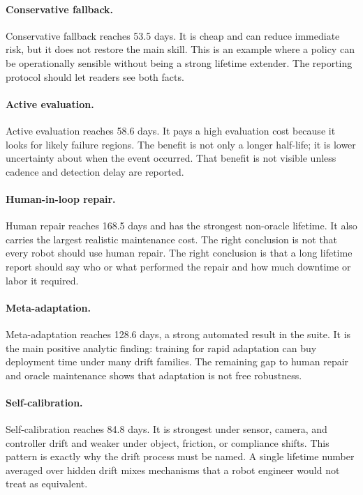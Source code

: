 \documentclass{article}
\begin{document}
\paragraph{Conservative fallback.}
Conservative fallback reaches 53.5 days. It is cheap and can reduce immediate
risk, but it does not restore the main skill. This is an example where a policy
can be operationally sensible without being a strong lifetime extender. The
reporting protocol should let readers see both facts.

\paragraph{Active evaluation.}
Active evaluation reaches 58.6 days. It pays a high evaluation cost because it
looks for likely failure regions. The benefit is not only a longer half-life;
it is lower uncertainty about when the event occurred. That benefit is not
visible unless cadence and detection delay are reported.

\paragraph{Human-in-loop repair.}
Human repair reaches 168.5 days and has the strongest non-oracle lifetime. It
also carries the largest realistic maintenance cost. The right conclusion is
not that every robot should use human repair. The right conclusion is that a
long lifetime report should say who or what performed the repair and how much
downtime or labor it required.

\paragraph{Meta-adaptation.}
Meta-adaptation reaches 128.6 days, a strong automated result in the suite. It
is the main positive analytic finding: training for rapid adaptation can buy
deployment time under many drift families. The remaining gap to human repair
and oracle maintenance shows that adaptation is not free robustness.

\paragraph{Self-calibration.}
Self-calibration reaches 84.8 days. It is strongest under sensor, camera, and
controller drift and weaker under object, friction, or compliance shifts. This
pattern is exactly why the drift process must be named. A single lifetime
number averaged over hidden drift mixes mechanisms that a robot engineer would
not treat as equivalent.
\end{document}
